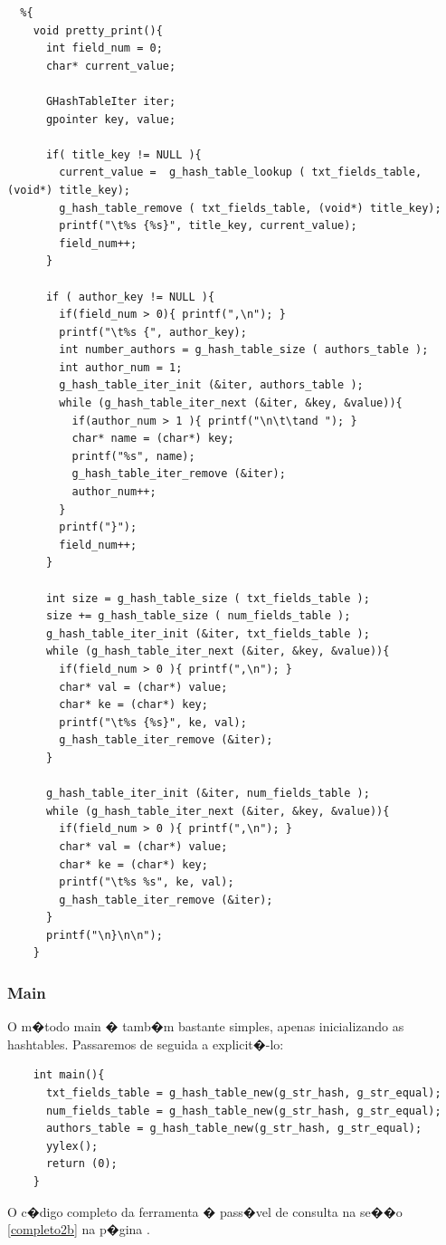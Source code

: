 \documentclass{report}
\begin{document}
  \begin{lstlisting}
  %{
    void pretty_print(){
      int field_num = 0;
      char* current_value;

      GHashTableIter iter;
      gpointer key, value;

      if( title_key != NULL ){
        current_value =  g_hash_table_lookup ( txt_fields_table,(void*) title_key);
        g_hash_table_remove ( txt_fields_table, (void*) title_key);
        printf("\t%s {%s}", title_key, current_value);
        field_num++;
      }

      if ( author_key != NULL ){
        if(field_num > 0){ printf(",\n"); }
        printf("\t%s {", author_key);
        int number_authors = g_hash_table_size ( authors_table );
        int author_num = 1;
        g_hash_table_iter_init (&iter, authors_table );
        while (g_hash_table_iter_next (&iter, &key, &value)){
          if(author_num > 1 ){ printf("\n\t\tand "); }
          char* name = (char*) key;
          printf("%s", name);
          g_hash_table_iter_remove (&iter);
          author_num++;
        } 
        printf("}");
        field_num++;
      }

      int size = g_hash_table_size ( txt_fields_table );
      size += g_hash_table_size ( num_fields_table );
      g_hash_table_iter_init (&iter, txt_fields_table );
      while (g_hash_table_iter_next (&iter, &key, &value)){
        if(field_num > 0 ){ printf(",\n"); }
        char* val = (char*) value;
        char* ke = (char*) key;
        printf("\t%s {%s}", ke, val);
        g_hash_table_iter_remove (&iter);
      } 

      g_hash_table_iter_init (&iter, num_fields_table );
      while (g_hash_table_iter_next (&iter, &key, &value)){
        if(field_num > 0 ){ printf(",\n"); }
        char* val = (char*) value;
        char* ke = (char*) key;
        printf("\t%s %s", ke, val);
        g_hash_table_iter_remove (&iter);
      }
      printf("\n}\n\n");
    }
    \end{lstlisting}

    \subsubsection{Main}
    O m�todo main � tamb�m bastante simples, apenas inicializando as hashtables. Passaremos de seguida a explicit�-lo:
      \begin{lstlisting}
    int main(){
      txt_fields_table = g_hash_table_new(g_str_hash, g_str_equal);
      num_fields_table = g_hash_table_new(g_str_hash, g_str_equal);
      authors_table = g_hash_table_new(g_str_hash, g_str_equal);
      yylex();
      return (0);
    }
    \end{lstlisting}
    O c�digo completo da ferramenta � pass�vel de consulta na se��o \ref{completo2b} na p�gina \pageref{completo2a}.
\end{document}
